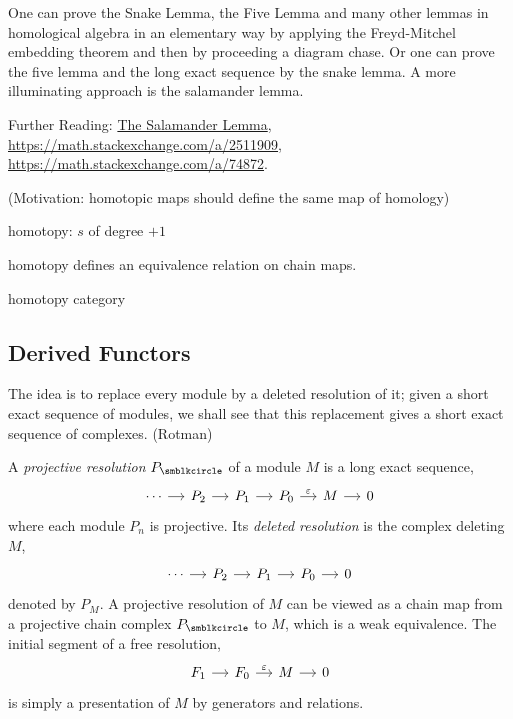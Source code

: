 One can prove the Snake Lemma, the Five Lemma and many other lemmas in homological algebra in an elementary way by applying the Freyd-Mitchel embedding theorem and then by proceeding a diagram chase. Or one can prove the five lemma and the long exact sequence by the snake lemma. A more illuminating approach is the salamander lemma.

Further Reading: \href{https://ncatlab.org/nlab/show/salamander+lemma}{The Salamander Lemma}, \url{https://math.stackexchange.com/a/2511909}, \url{https://math.stackexchange.com/a/74872}.

(Motivation: homotopic maps should define the same map of homology)

homotopy: $s$ of degree $+1$

homotopy defines an equivalence relation on chain maps.

homotopy category

\subsection{Derived Functors}

The idea is to replace every module by a deleted resolution of it; given a short exact sequence of modules, we shall see that this replacement gives a short exact sequence of complexes. (Rotman)

A \emph{projective resolution} $P_\CCCIR$ of a module $M$ is a long exact sequence,
\begin{equation*}
  \begin{tikzcd}[sep=small]
    \dotsb & P_2 & P_1 & P_0 & M & 0
    \arrow[from=1-1,]{1-2}[]{}
    \arrow[from=1-2,]{1-3}[]{}
    \arrow[from=1-3,]{1-4}[]{}
    \arrow[from=1-4,]{1-5}[]{\varepsilon}
    \arrow[from=1-5,]{1-6}[]{}
  \end{tikzcd}
\end{equation*}
where each module $P_n$ is projective. Its \emph{deleted resolution} is the complex deleting $M$,
\begin{equation*}
  \begin{tikzcd}[sep=small]
    \dotsb & P_2 & P_1 & P_0 & 0
    \arrow[from=1-1,]{1-2}[]{}
    \arrow[from=1-2,]{1-3}[]{}
    \arrow[from=1-3,]{1-4}[]{}
    \arrow[from=1-4,]{1-5}[]{}
  \end{tikzcd}
\end{equation*}
denoted by $P_M$. A projective resolution of $M$ can be viewed as a chain map from a projective chain complex $P_\CCCIR$ to $M$, which is a weak equivalence. The initial segment of a free resolution,
\begin{equation*}
  \begin{tikzcd}[sep=small]
    F_1 & F_0 & M & 0
    \arrow[from=1-1,]{1-2}[]{}
    \arrow[from=1-2,]{1-3}[]{\varepsilon}
    \arrow[from=1-3,]{1-4}[]{}
  \end{tikzcd}
\end{equation*}
is simply a presentation of $M$ by generators and relations.

